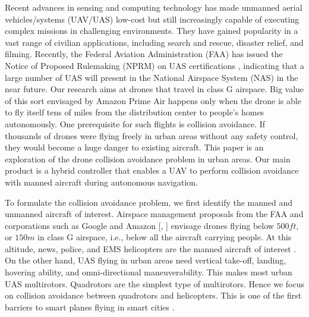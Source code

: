 \documentclass[journal,11pt,onecolumn,draftclsnofoot,]{IEEEtran}
\begin{document}
Recent advances in sensing and computing technology has made unmanned aerial vehicles/systems (UAV/UAS) low-cost but still increasingly capable of executing complex missions in challenging environments. They have gained popularity in a vast range of civilian applications, including search and rescue, disaster relief, and filming. Recently, the Federal Aviation Administration (FAA) has issued the Notice of Proposed Rulemaking (NPRM) on UAS certifications \cite{faa-nprm}, indicating that a large number of UAS will present in the National Airspace System (NAS) in the near future. Our research aims at drones that travel in class G airspace. Big value of this sort envisaged by Amazon Prime Air \cite{amazon_whitepaper_safe_access} happens only when the drone is able to fly itself tens of miles from the distribution center to people's homes autonomously. One prerequisite for such flights is collision avoidance. If thousands of drones were flying freely in urban areas without any safety control, they would become a huge danger to existing aircraft. This paper is an exploration of the drone collision avoidance problem in urban areas. Our main product is a hybrid controller that enables a UAV to perform collision avoidance with manned aircraft during autonomous navigation. 

To formulate the collision avoidance problem, we first identify the manned and unmanned aircraft of interest. Airspace management proposals from the FAA \cite{faa-nprm} and corporations such as Google \cite{google_airspace_system} and Amazon [, ] envisage drones flying below $500ft$, or $150m$ in class G airspace, i.e., below all the aircraft carrying people. At this altitude, news, police, and EMS helicopters are the manned aircraft of interest \cite{google_airspace_system}. On the other hand, UAS flying in urban areas need vertical take-off, landing, hovering ability, and omni-directional maneuverability. This makes most urban UAS multirotors. Quadrotors are the simplest type of multirotors. Hence we focus on collision avoidance between quadrotors and helicopters. This is one of the first barriers to smart planes flying in smart cities \cite{google_airspace_system}.
\end{document}
